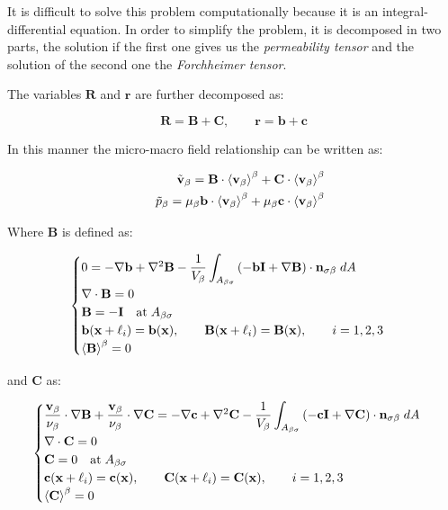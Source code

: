 It is difficult to solve this problem computationally because it is an integral-differential equation.
In order to simplify the problem, it is decomposed in two parts, the solution if the first one gives us the \textit{permeability tensor} and the solution of the second one the \textit{Forchheimer tensor}.

The variables $\mathbf{R}$ and $\mathbf{r}$ are further decomposed as:

$$
 \mathbf{R} = \mathbf{B} + \mathbf{C}, \qquad \mathbf{r} = \mathbf{b} + \mathbf{c}
$$

In this manner the micro-macro field relationship can be written as:

\begin{eqnarray}
	&& \tilde{\textbf{v}}_{\beta} = \mathbf{B} \cdot {\left< \textbf{v}_{\beta}\right>}^{\beta} + \mathbf{C} \cdot {\left< \textbf{v}_{\beta}\right>}^{\beta}  	\label{eq:closure_viab_divison} \\
	&& \tilde{p}_{\beta} = \mu_{\beta} \mathbf{b} \cdot {\left< \textbf{v}_{\beta}\right>}^{\beta} + \mu_{\beta} \mathbf{c} \cdot {\left< \textbf{v}_{\beta}\right>}^{\beta} \label{eq:closure_viab_hp}
\end{eqnarray}

Where $\mathbf{B}$ is defined as:

\begin{eqnarray}
	\begin{cases}
		0 = -\nabla \mathbf{b} + \nabla^2 \mathbf{B} - \dfrac{1}{V_\beta} \displaystyle \int_{A_{\beta \sigma}}  \left(-\mathbf{b}\mathbf{I}  +  \nabla \mathbf{B} \right) \cdot \mathbf{n}_{\sigma \beta} \;dA  \\
		\nabla \cdot \mathbf{B} = 0  \\
		\mathbf{B} = -\mathbf{I} \quad \textrm{at} \; A_{\beta \sigma} \\
		\mathbf{b}(\mathbf{x} +\ell_i) = \mathbf{b}(\mathbf{x}), \qquad \mathbf{B}(\mathbf{x} +\ell_i) = \mathbf{B}(\mathbf{x}), \qquad i=1,2,3 \\
		{\left< \mathbf{B} \right>}^{\beta} = 0
	\end{cases}
\label{eq:B_problem}
\end{eqnarray}

and $\mathbf{C}$ as:

\begin{eqnarray}
	\begin{cases}
		\dfrac{\textbf{v}_{\beta}}{\nu_{\beta}} \cdot  \nabla \mathbf{B} +\dfrac{\textbf{v}_{\beta}}{\nu_{\beta}} \cdot  \nabla \mathbf{C} = -\nabla \mathbf{c} +  \nabla^2 \mathbf{C} - \dfrac{1}{V_\beta} \displaystyle \int_{A_{\beta \sigma}}  \left(-\mathbf{c}\mathbf{I}  +  \nabla \mathbf{C} \right) \cdot \mathbf{n}_{\sigma \beta} \;dA  \\
		\nabla \cdot \mathbf{C} = 0  \\
		\mathbf{C} = 0 \quad \textrm{at} \; A_{\beta \sigma} \\
		\mathbf{c}(\mathbf{x} +\ell_i) = \mathbf{c}(\mathbf{x}), \qquad \mathbf{C}(\mathbf{x} +\ell_i) = \mathbf{C}(\mathbf{x}), \qquad i=1,2,3 \\
		{\left< \mathbf{C} \right>}^{\beta} = 0
	\end{cases}
\label{eq:C_problem}
\end{eqnarray}

